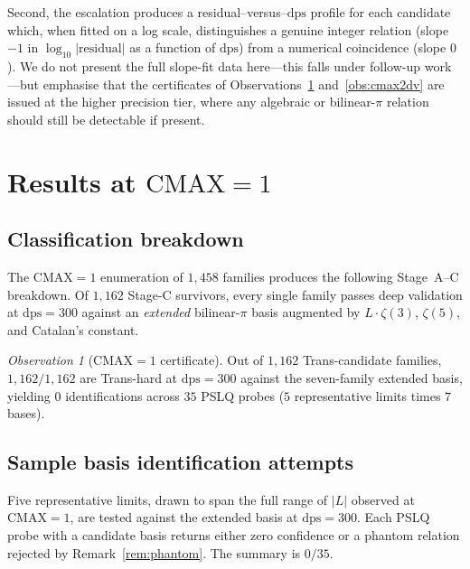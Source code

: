 \documentclass[11pt,a4paper]{amsart}
\theoremstyle{definition}
\theoremstyle{remark}
\newtheorem{observation}[theorem]{Observation}
\newcommand{\dps}{\mathrm{dps}}
\begin{document}
Second, the escalation produces a residual--versus--$\dps$ profile
for each candidate which, when fitted on a log scale, distinguishes a
genuine integer relation (slope $-1$ in $\log_{10}|\mathrm{residual}|$
as a function of $\dps$) from a numerical coincidence (slope $0$).
We do not present the full slope-fit data here---this falls under
follow-up work---but emphasise that the certificates of
Observations~\ref{obs:cmax1cert} and~\ref{obs:cmax2dv} are issued at
the higher precision tier, where any algebraic or bilinear-$\pi$
relation should still be detectable if present.

\section{Results at $\mathrm{CMAX}=1$}\label{sec:cmax1}

\subsection{Classification breakdown}

The $\mathrm{CMAX}=1$ enumeration of $1{,}458$ families produces the
following Stage~A--C breakdown.  Of $1{,}162$ Stage-C survivors, every
single family passes deep validation at $\dps=300$ against an
\emph{extended} bilinear-$\pi$ basis augmented by
$L\cdot\zeta(3)$, $\zeta(5)$, and Catalan's constant.

\begin{observation}[CMAX$=1$ certificate]
\label{obs:cmax1cert}
Out of $1{,}162$ Trans-candidate families, $1{,}162/1{,}162$ are
Trans-hard at $\dps=300$ against the seven-family extended basis,
yielding $0$ identifications across $35$ PSLQ probes ($5$ representative
limits times $7$ bases).
\end{observation}

\subsection{Sample basis identification attempts}

Five representative limits, drawn to span the full range of $|L|$
observed at $\mathrm{CMAX}=1$, are tested against the extended basis at
$\dps=300$.  Each PSLQ probe with a candidate basis returns either
zero confidence or a phantom relation rejected by
Remark~\ref{rem:phantom}.  The summary is $0/35$.
\end{document}
